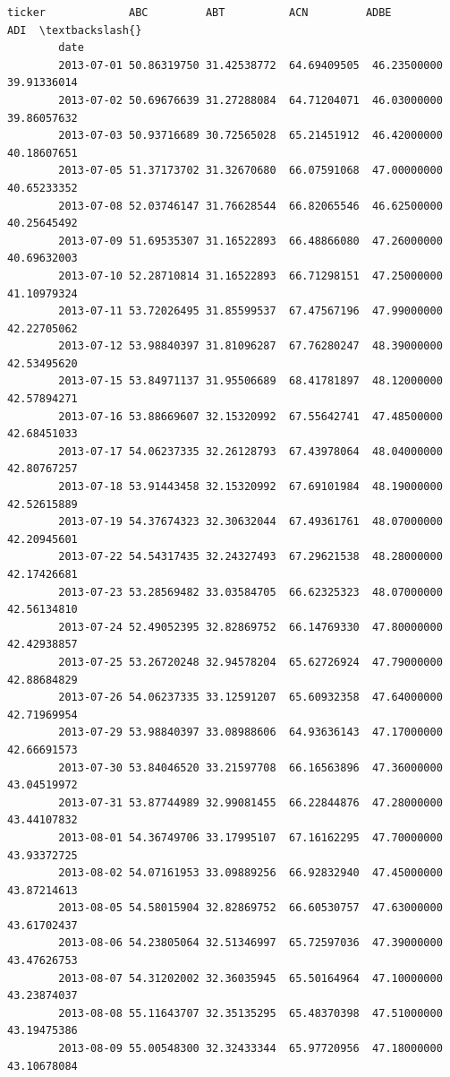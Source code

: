 \documentclass[11pt]{article}
\begin{document}
\begin{Verbatim}[commandchars=\\\{\}]
        ticker             ABC         ABT          ACN         ADBE         ADI  \textbackslash{}
        date                                                                       
        2013-07-01 50.86319750 31.42538772  64.69409505  46.23500000 39.91336014   
        2013-07-02 50.69676639 31.27288084  64.71204071  46.03000000 39.86057632   
        2013-07-03 50.93716689 30.72565028  65.21451912  46.42000000 40.18607651   
        2013-07-05 51.37173702 31.32670680  66.07591068  47.00000000 40.65233352   
        2013-07-08 52.03746147 31.76628544  66.82065546  46.62500000 40.25645492   
        2013-07-09 51.69535307 31.16522893  66.48866080  47.26000000 40.69632003   
        2013-07-10 52.28710814 31.16522893  66.71298151  47.25000000 41.10979324   
        2013-07-11 53.72026495 31.85599537  67.47567196  47.99000000 42.22705062   
        2013-07-12 53.98840397 31.81096287  67.76280247  48.39000000 42.53495620   
        2013-07-15 53.84971137 31.95506689  68.41781897  48.12000000 42.57894271   
        2013-07-16 53.88669607 32.15320992  67.55642741  47.48500000 42.68451033   
        2013-07-17 54.06237335 32.26128793  67.43978064  48.04000000 42.80767257   
        2013-07-18 53.91443458 32.15320992  67.69101984  48.19000000 42.52615889   
        2013-07-19 54.37674323 32.30632044  67.49361761  48.07000000 42.20945601   
        2013-07-22 54.54317435 32.24327493  67.29621538  48.28000000 42.17426681   
        2013-07-23 53.28569482 33.03584705  66.62325323  48.07000000 42.56134810   
        2013-07-24 52.49052395 32.82869752  66.14769330  47.80000000 42.42938857   
        2013-07-25 53.26720248 32.94578204  65.62726924  47.79000000 42.88684829   
        2013-07-26 54.06237335 33.12591207  65.60932358  47.64000000 42.71969954   
        2013-07-29 53.98840397 33.08988606  64.93636143  47.17000000 42.66691573   
        2013-07-30 53.84046520 33.21597708  66.16563896  47.36000000 43.04519972   
        2013-07-31 53.87744989 32.99081455  66.22844876  47.28000000 43.44107832   
        2013-08-01 54.36749706 33.17995107  67.16162295  47.70000000 43.93372725   
        2013-08-02 54.07161953 33.09889256  66.92832940  47.45000000 43.87214613   
        2013-08-05 54.58015904 32.82869752  66.60530757  47.63000000 43.61702437   
        2013-08-06 54.23805064 32.51346997  65.72597036  47.39000000 43.47626753   
        2013-08-07 54.31202002 32.36035945  65.50164964  47.10000000 43.23874037   
        2013-08-08 55.11643707 32.35135295  65.48370398  47.51000000 43.19475386   
        2013-08-09 55.00548300 32.32433344  65.97720956  47.18000000 43.10678084   

\end{Verbatim}
\end{document}
